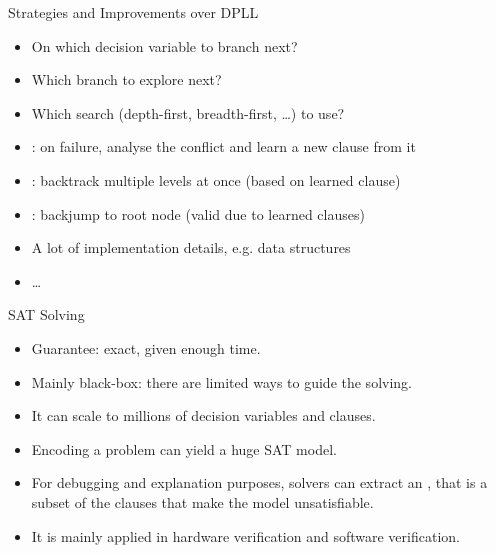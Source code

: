 \documentclass{cons-beamer}
\begin{document}
\begin{frame}{Strategies and Improvements over DPLL}\label{sat}
  \begin{itemize}
    \item On which decision variable to branch next?
    \item Which branch to explore next?
    \item Which search (depth-first, breadth-first, \dots) to use?
  \end{itemize}\vfill%
  \begin{itemize}
    \item {}: on failure, analyse the conflict and learn a new clause from it
    \item {}: backtrack multiple levels at once (based on learned clause)
    \item {}: backjump to root node (valid due to learned clauses)
    \item A lot of implementation details, e.g. data structures
    \item \dots
  \end{itemize}
\end{frame}

\begin{frame}{SAT Solving}
  \begin{itemize}
    \item Guarantee: exact, given enough time. \vfill
    \item Mainly black-box: there are limited ways to guide the solving.
      \vfill
    \item It can scale to millions of decision variables and clauses.
      \vfill
    \item Encoding a problem can yield a huge SAT model. \vfill
    \item For debugging and explanation purposes, solvers can extract an
      , that is a subset of the clauses that
      make the model unsatisfiable. \vfill
    \item It is mainly applied in hardware verification and software
      verification.
  \end{itemize}
\end{frame}
\end{document}

